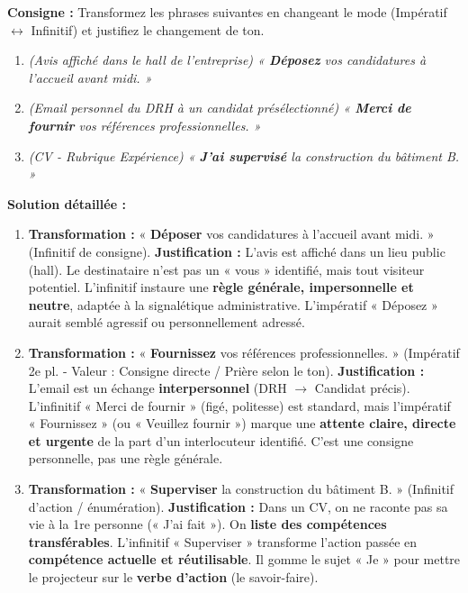 \documentclass[11pt]{article}
\newcommand{\cle}[1]{{\popxbold\color{popdark}#1}}
\begin{document}
\begin{exoresolu}
\textbf{Consigne :} Transformez les phrases suivantes en changeant le mode (Impératif $\leftrightarrow$ Infinitif) et justifiez le changement de ton.

\begin{enumerate}
    \item \textit{(Avis affiché dans le hall de l'entreprise) « \textbf{Déposez} vos candidatures à l'accueil avant midi. »}
    \item \textit{(Email personnel du DRH à un candidat présélectionné) « \textbf{Merci de fournir} vos références professionnelles. »}
    \item \textit{(CV - Rubrique Expérience) « \textbf{J'ai supervisé} la construction du bâtiment B. »}
\end{enumerate}
\tcblower
\textbf{Solution détaillée :}

\begin{enumerate}
    \item \textbf{Transformation :} « \textbf{Déposer} vos candidatures à l'accueil avant midi. » (Infinitif de consigne).
    \textbf{Justification :} L'avis est affiché dans un lieu public (hall). Le destinataire n'est pas un « vous » identifié, mais tout visiteur potentiel. L'infinitif instaure une \textbf{règle générale, impersonnelle et neutre}, adaptée à la signalétique administrative. L'impératif « Déposez » aurait semblé agressif ou personnellement adressé.
    
    \item \textbf{Transformation :} « \textbf{Fournissez} vos références professionnelles. » (Impératif 2e pl. - Valeur : Consigne directe / Prière selon le ton).
    \textbf{Justification :} L'email est un échange \textbf{interpersonnel} (DRH $\rightarrow$ Candidat précis). L'infinitif « Merci de fournir » (figé, politesse) est standard, mais l'impératif « Fournissez » (ou « Veuillez fournir ») marque une \textbf{attente claire, directe et urgente} de la part d'un interlocuteur identifié. C'est une consigne personnelle, pas une règle générale.
    
    \item \textbf{Transformation :} « \textbf{Superviser} la construction du bâtiment B. » (Infinitif d'action / énumération).
    \textbf{Justification :} Dans un CV, on ne raconte pas sa vie à la 1re personne (« J'ai fait »). On \textbf{liste des compétences transférables}. L'infinitif « Superviser » transforme l'action passée en \textbf{compétence actuelle et réutilisable}. Il gomme le sujet « Je » pour mettre le projecteur sur le \textbf{verbe d'action} (le \cle{savoir-faire}).
\end{enumerate}
\end{exoresolu}
\end{document}
